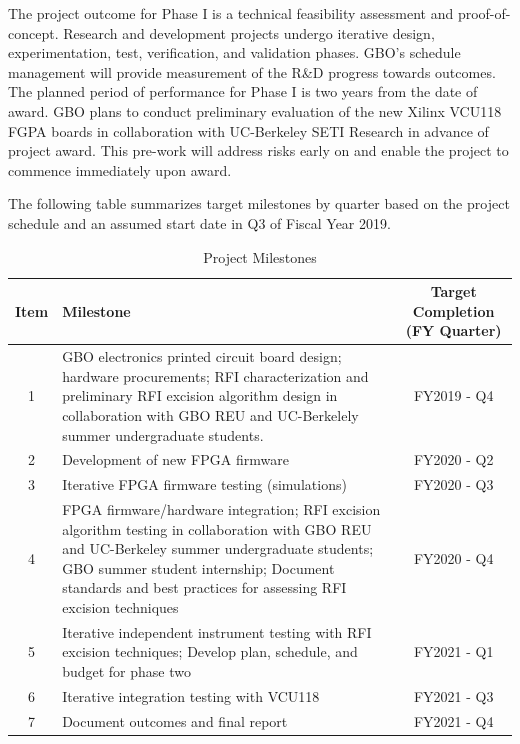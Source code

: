 \documentclass[10pt]{myNSF}
\begin{document}
The project outcome for Phase {\sc I} is a technical feasibility
assessment and proof-of-concept. Research and development projects
undergo iterative design, experimentation, test, verification, and
validation phases. GBO's schedule management will provide measurement
of the R\&D progress towards outcomes. The planned period of
performance for Phase {\sc I} is two years from the date of award. GBO
plans to conduct preliminary evaluation of the new Xilinx VCU118 FGPA
boards in collaboration with UC-Berkeley SETI Research in advance of
project award. This pre-work will address risks early on and enable
the project to commence immediately upon award.

The following table summarizes target milestones by quarter based on
the project schedule and an assumed start date in Q3 of Fiscal Year
2019.

\begin{table}[t]
  \centering
  \caption{Project Milestones \label{table:milestones}}
  \begin{tabular}{|c|p{3.75in}|c|}
    \hline
    Item & Milestone & Target Completion (FY Quarter) \\
    \hline
    1 & GBO electronics printed circuit board design; hardware procurements; RFI characterization and preliminary RFI excision algorithm design in collaboration with GBO REU and UC-Berkelely summer undergraduate students. & FY2019 - Q4 \\
    \hline
    2 & Development of new FPGA firmware & FY2020 - Q2 \\
    \hline
    3 & Iterative FPGA firmware testing (simulations) & FY2020 - Q3 \\
    \hline
    4 & FPGA firmware/hardware integration; RFI excision algorithm testing in collaboration with GBO REU and UC-Berkeley summer undergraduate students; GBO summer student internship; Document standards and best practices for assessing RFI excision techniques & FY2020 - Q4 \\
    \hline
    5 & Iterative independent instrument testing with RFI excision techniques; Develop plan, schedule, and budget for phase two & FY2021 - Q1 \\
    \hline
    6 & Iterative integration testing with VCU118 & FY2021 - Q3 \\
    \hline
    7 & Document outcomes and final report & FY2021 - Q4 \\
    \hline
  \end{tabular}
\end{table}
\end{document}
